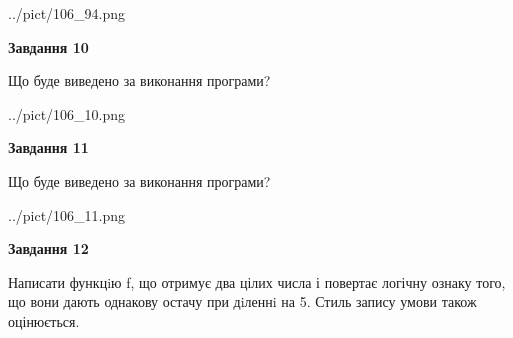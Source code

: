 \documentclass[12pt, ukrainian]{article}
\begin{document}
{\begin {large}
\begin{center}
	{../pict/106_94.png}
\end{center}
\newpage

{\begin {center}\textbf{Завдання 10}\end {center}}

Що буде виведено за виконання програми?\par
\begin{center}
	{../pict/106_10.png}
\end{center}
\newpage

{\begin {center}\textbf{Завдання 11}\end {center}}

Що буде виведено за виконання програми?\par
\begin{center}
	{../pict/106_11.png}
\end{center}
\newpage

{\begin {center}\textbf{Завдання 12}\end {center}}


Написати функцiю f, що отримує два цілих числа і повертає логічну ознаку того, що вони дають однакову остачу при дiленнi на 5. Стиль запису умови також оцінюється.\par
\newpage

\end {large}}
\end{document}
